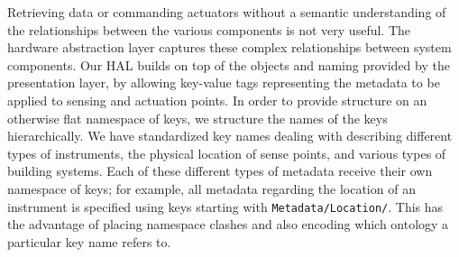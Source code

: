 Retrieving data or commanding actuators without a semantic understanding of the relationships between the various components is not very useful.  
%
The hardware abstraction layer captures these complex relationships between system components.  
%
Our HAL builds on top of the objects and naming provided by the presentation layer, by allowing key-value tags representing the metadata to be applied to sensing and actuation points.  In order to provide structure on an otherwise flat namespace of keys, we structure the names of the keys hierarchically.  We have standardized key names dealing with describing different types of instruments, the physical location of sense points, and various types of building systems.  Each of these different types of metadata receive their own namespace of keys; for example, all metadata regarding the location of an instrument is specified using keys starting with {\tt Metadata/Location/}.  This has the advantage of placing namespace clashes and also encoding which ontology a particular key name refers to.


